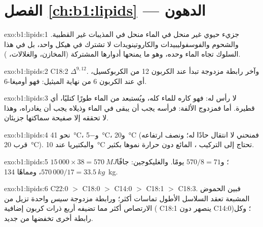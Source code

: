 \section*{الفصل \ref{ch:b1:lipids} --- الدهون}

\begin{solution}{exo:b1:lipids:1}
 جزيء حيوي غير منحل في الماء منحل في المذيبات غير القطبية.
والشحوم والفوسفوليبيدات  والكاروتينويدات لا تشترك في هيكل
واحد، بل في هذا السلوك تجاه الماء وحده، وهو ما يمنحها أدوارها
المشتركة (المخازن، والغلالات، ).
\end{solution}

\begin{solution}{exo:b1:lipids:2}
C18:2 $\Delta^{9,12}$. وآخر رابطة مزدوجة تبدأ عند الكربون 12 من
الكربوكسيل، أي عند الكربون 6 من نهاية الميثيل: فهو أوميغا-6.
\end{solution}

\begin{solution}{exo:b1:lipids:3}
 لا رأس  له: فهو كاره للماء كله، ويُستبعد من
الماء طورًا كتليًا، أي قطيرة. أما  فمزدوج الألفة: فرأسه
 يجب أن يبقى في الماء وذيلاه يجب أن يغادراه، وهذا لا تحققه إلا
صفيحة سماكتها جزيئان.
\end{solution}

\begin{solution}{exo:b1:lipids:4}
نحو \qty{41}{\celsius}، و\qty{-5}{\celsius}، و\qty{20}{\celsius}
(فمنحني  لا انتقال حادًا له؛ ونصف ارتفاعه قرب
\qty{20}{\celsius}). والبكتيريا عند \qty{10}{\celsius} تحتاج إلى
التركيب ، المائع دون حرارة نموها بكثير.
\end{solution}

\begin{solution}{exo:b1:lipids:5}
$15\,000\times 38 = \qty{570}{MJ}$؛ و$570/8 = 71$ يومًا.
والغليكوجين: جافًا $570\,000/17 = \qty{33.5}{kg}$، ومماهًا
\qty{134}{kg}.
\end{solution}

\begin{solution}{exo:b1:lipids:6}
C22:0 $>$ C18:0 $>$ C14:0 $>$ C18:1 $>$ C18:3. فبين الحموض المشبعة
تعقد السلاسل الأطول تماسات  أكثر؛ ورابطة مزدوجة
\emph{سيس} واحدة تزيل من الارتصاص أكثر مما تضيفه أربع ذرات كربون
إضافية ( C18:1 ينصهر دون C14:0)؛ وكل رابطة أخرى تخفضها من جديد.
\end{solution}

